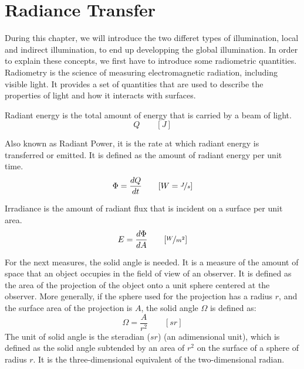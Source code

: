 \chapter{Radiance Transfer}

During this chapter, we will introduce the two differet types of illumination, local and indirect illumination, to end up developping the global illumination. In order to explain these concepts, we first have to introduce some radiometric quantities. Radiometry is the science of measuring electromagnetic radiation, including visible light. It provides a set of quantities that are used to describe the properties of light and how it interacts with surfaces.
\begin{definicion}
Radiant energy is the total amount of energy that is carried by a beam of light.
\begin{equation*}
    Q\qquad [J]
\end{equation*}
\end{definicion}

\begin{definicion}
    Also known as Radiant Power, it is the rate at which radiant energy is transferred or emitted. It is defined as the amount of radiant energy per unit time.
\begin{equation*}
    \Phi = \frac{dQ}{dt} \qquad [W=\nicefrac{J}{s}]
\end{equation*}
\end{definicion}

\begin{definicion}[Irradiance]
Irradiance is the amount of radiant flux that is incident on a surface per unit area.
\begin{equation*}
    E = \frac{d\Phi}{dA} \qquad [\nicefrac{W}{m^2}]
\end{equation*}
\end{definicion}

For the next measures, the solid angle is needed. It is a measure of the amount of space that an object occupies in the field of view of an observer. It is defined as the area of the projection of the object onto a unit sphere centered at the observer. More generally, if the sphere used for the projection has a radius $r$, and the surface area of the projection is $A$, the solid angle $\Omega$ is defined as:
\begin{equation*}
    \Omega = \frac{A}{r^2} \qquad [sr]
\end{equation*}
The unit of solid angle is the steradian ($sr$) (an adimensional unit), which is defined as the solid angle subtended by an area of $r^2$ on the surface of a sphere of radius $r$. It is the three-dimensional equivalent of the two-dimensional radian.

